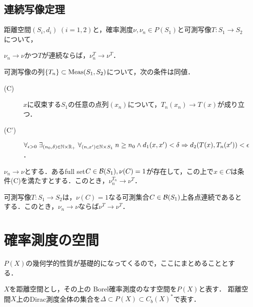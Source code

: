 \documentclass[uplatex,dvipdfmx]{jsreport}
\begin{document}
\subsection{連続写像定理}

\begin{notation}
    距離空間$(S_i,d_i)\;(i=1,2)$と，確率測度$\nu,\nu_n\in P(S_1)$と可測写像$T:S_1\to S_2$について，
\end{notation}

\begin{proposition}
    $\nu_n\to\nu$かつ$T$が連続ならば，$\nu_n^T\to\nu^T$．
\end{proposition}

\begin{lemma}
    可測写像の列$\{T_n\}\subset\mathrm{Meas}(S_1,S_2)$について，次の条件は同値．
    \begin{description}
        \item[(C)] $x$に収束する$S_1$の任意の点列$(x_n)$について，$T_n(x_n)\to T(x)$が成り立つ．
        \item[(C')] $\forall_{\epsilon>0}\;\exists_{(n_0,\delta)\in\mathbb{N}\times\mathbb{R}_+}\;\forall_{(n,x')\in\mathbb{N}\times S_1}\;n\ge n_0\land d_1(x,x')<\delta\Rightarrow d_2(T(x),T_n(x'))<\epsilon$．
    \end{description}
\end{lemma}

\begin{theorem}
    $\nu_n\to\nu$とする．あるfull set$C\in\mathcal{B}(S_1),\nu(C)=1$が存在して，この上で$x\in C$は条件(C)を満たすとする．このとき，$\nu_n^{T_n}\to\nu^T$．
\end{theorem}

\begin{corollary}
    可測写像$T:S_1\to S_2$は，$\nu(C)=1$なる可測集合$C\in\mathcal{B}(S_1)$上各点連続であるとする．このとき，$\nu_n\to\nu$ならば$\nu^T\to\nu^T$．
\end{corollary}

\section{確率測度の空間}

\begin{tcolorbox}[colframe=ForestGreen, colback=ForestGreen!10!white,breakable,colbacktitle=ForestGreen!40!white,coltitle=black,fonttitle=\bfseries\sffamily,
title=]
    $P(X)$の幾何学的性質が基礎的になってくるので，ここにまとめることとする．
\end{tcolorbox}

\begin{notation}
    $X$を距離空間とし，その上の
    Borel確率測度のなす空間を$P(X)$と表す．
    距離空間$X$上のDirac測度全体の集合を$\Delta\subset P(X)\subset C_b(X)^*$で表す．
\end{notation}
\end{document}

